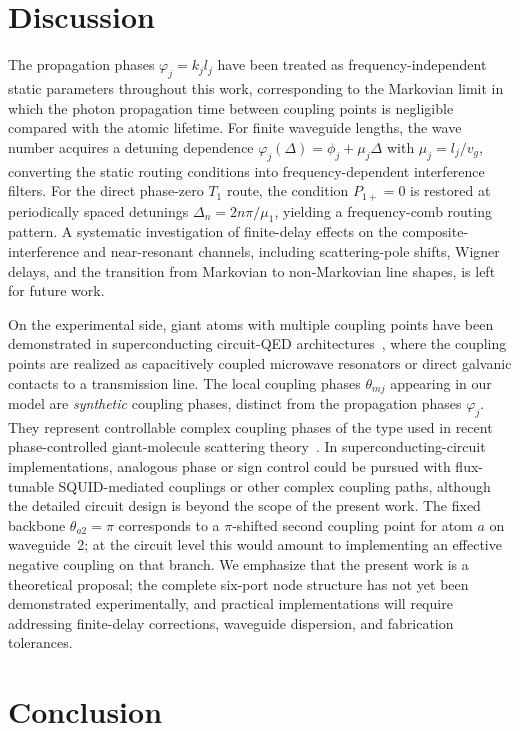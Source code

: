 \documentclass[aps,pra,reprint,superscriptaddress,nofootinbib,longbibliography,floatfix]{revtex4-2}
\newcommand{\Del}{\Delta}
\newcommand{\ph}{\varphi}
\newcommand{\Poneplus}{P_{1+}}
\begin{document}
\FloatBarrier
\section{Discussion}

The propagation phases $\ph_j=k_j l_j$ have been treated as frequency-independent static parameters throughout this work, corresponding to the Markovian limit in which the photon propagation time between coupling points is negligible compared with the atomic lifetime.
For finite waveguide lengths, the wave number acquires a detuning dependence $\ph_j(\Del)=\phi_j+\mu_j\Del$ with $\mu_j=l_j/v_g$, converting the static routing conditions into frequency-dependent interference filters.
For the direct phase-zero $T_1$ route, the condition $\Poneplus=0$ is restored at periodically spaced detunings $\Del_n=2n\pi/\mu_1$, yielding a frequency-comb routing pattern.
A systematic investigation of finite-delay effects on the composite-interference and near-resonant channels, including scattering-pole shifts, Wigner delays, and the transition from Markovian to non-Markovian line shapes, is left for future work.

On the experimental side, giant atoms with multiple coupling points have been demonstrated in superconducting circuit-QED architectures~\cite{Kannan2020GiantAtom}, where the coupling points are realized as capacitively coupled microwave resonators or direct galvanic contacts to a transmission line.
The local coupling phases $\theta_{mj}$ appearing in our model are \emph{synthetic} coupling phases, distinct from the propagation phases $\varphi_j$.
They represent controllable complex coupling phases of the type used in recent phase-controlled giant-molecule scattering theory~\cite{Sun2025PhaseControlled}.
In superconducting-circuit implementations, analogous phase or sign control could be pursued with flux-tunable SQUID-mediated couplings or other complex coupling paths, although the detailed circuit design is beyond the scope of the present work.
The fixed backbone $\theta_{a2}=\pi$ corresponds to a $\pi$-shifted second coupling point for atom $a$ on waveguide~2; at the circuit level this would amount to implementing an effective negative coupling on that branch.
We emphasize that the present work is a theoretical proposal; the complete six-port node structure has not yet been demonstrated experimentally, and practical implementations will require addressing finite-delay corrections, waveguide dispersion, and fabrication tolerances.

\section{Conclusion}
\end{document}
